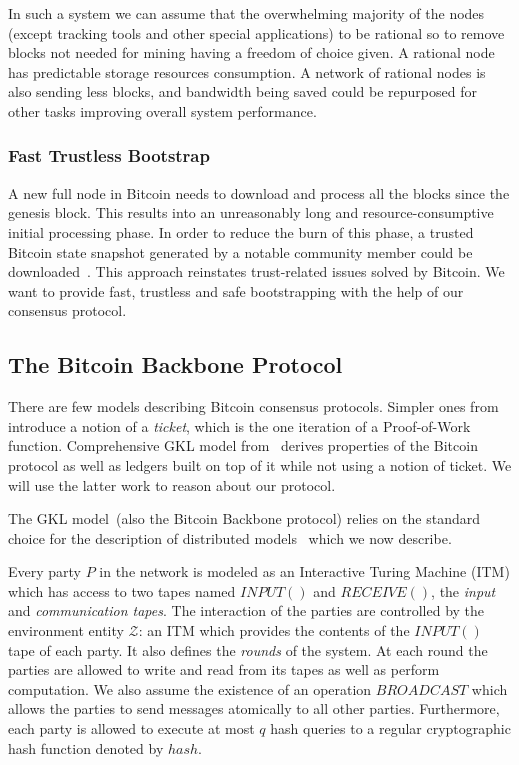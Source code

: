 \documentclass[conference,compsoc]{IEEEtran}
\begin{document}
In such a system we can assume that the overwhelming majority of the nodes (except tracking tools and other special applications) to be rational so to remove blocks not needed for mining having a freedom of choice given. A rational node has predictable storage resources consumption. A network of rational nodes is also sending less blocks, and bandwidth being saved could be repurposed for other tasks improving overall system performance.

\subsubsection{Fast Trustless Bootstrap}

A new full node in Bitcoin needs to download and process all the blocks since the genesis block. This results into an unreasonably long and resource-consumptive initial processing phase. In order to reduce the burn of this phase, a trusted Bitcoin state snapshot generated by a notable community member could be downloaded~\cite{snapshot}. This approach reinstates trust-related issues solved by Bitcoin. We want to provide fast, trustless and safe bootstrapping with the help of our consensus protocol.

\subsection{The Bitcoin Backbone Protocol}
\label{gkl_general}

There are few models describing Bitcoin consensus protocols. Simpler ones from~\cite{miller2014permacoin, milleranonymous} introduce a notion of a \textit{ticket}, which is the one iteration of a Proof-of-Work function. Comprehensive GKL model from~\cite{garay2015bitcoin} derives properties of the Bitcoin protocol as well as ledgers built on top of it while not using a notion of ticket. We will use the latter work to reason about our protocol. 

The GKL model~(also the Bitcoin Backbone protocol) relies on the standard choice for the description of distributed models~\cite{Canetti:2001} which we now describe.

 Every party  $P$ in the network is modeled as an Interactive Turing Machine (ITM) which has access to two tapes named $INPUT()$ and $RECEIVE()$, the {\it input} and {\it communication tapes}. The interaction of the parties are controlled by the environment entity $\mathcal{Z}$: an ITM which provides the contents of the $INPUT()$ tape of each party. It also defines the {\it rounds} of the system. At each round the parties are allowed to write and read from its tapes as well as perform computation. We also assume the existence of an operation $BROADCAST$ which allows the parties to send messages atomically to all other parties. Furthermore, each party is allowed to execute at most $q$ hash queries to a regular cryptographic hash function denoted by $hash$.  
\end{document}
